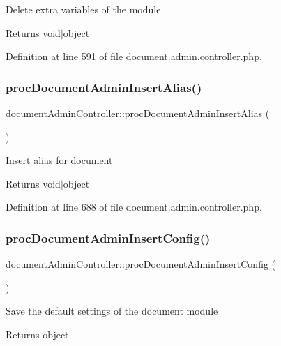 Delete extra variables of the module \begin{DoxyReturn}{Returns}
void$\vert$object 
\end{DoxyReturn}


Definition at line 591 of file document.\+admin.\+controller.\+php.

\mbox{\label{classdocumentAdminController_aa25a9a3e7a5ba0c15b50cc4d324386bc}} 
\subsubsection{\texorpdfstring{proc\+Document\+Admin\+Insert\+Alias()}{procDocumentAdminInsertAlias()}}
{\footnotesize\ttfamily document\+Admin\+Controller\+::proc\+Document\+Admin\+Insert\+Alias (\begin{DoxyParamCaption}{ }\end{DoxyParamCaption})}

Insert alias for document \begin{DoxyReturn}{Returns}
void$\vert$object 
\end{DoxyReturn}


Definition at line 688 of file document.\+admin.\+controller.\+php.

\mbox{\label{classdocumentAdminController_a8b865a9f22d0ca1df7967b4a179f4197}} 
\subsubsection{\texorpdfstring{proc\+Document\+Admin\+Insert\+Config()}{procDocumentAdminInsertConfig()}}
{\footnotesize\ttfamily document\+Admin\+Controller\+::proc\+Document\+Admin\+Insert\+Config (\begin{DoxyParamCaption}{ }\end{DoxyParamCaption})}

Save the default settings of the document module \begin{DoxyReturn}{Returns}
object 
\end{DoxyReturn}


